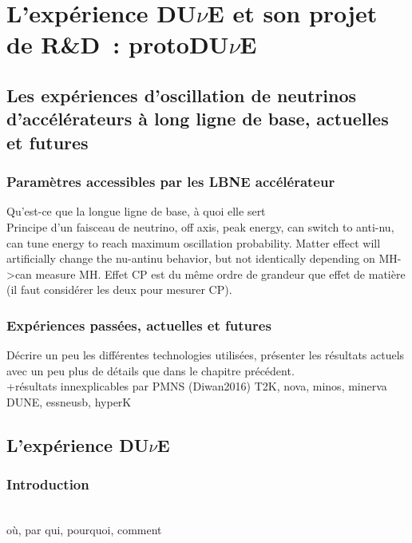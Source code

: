 \chapter{L'expérience DU$\nu$E et son projet de R\&D~: protoDU$\nu$E}
    
    \section{Les expériences d'oscillation de neutrinos d'accélérateurs à long ligne de base, actuelles et futures}
    
        \subsection{Paramètres accessibles par les LBNE accélérateur}
            
            Qu'est-ce que la longue ligne de base, à quoi elle sert\\
            Principe d'un faisceau de neutrino, off axis, peak energy, can switch to anti-nu, can tune energy to reach maximum oscillation probability. Matter effect will artificially change the nu-antinu behavior, but not identically depending on MH->can measure MH. Effet CP est du même ordre de grandeur que effet de matière (il faut considérer les deux pour mesurer CP).
                
        \subsection{Expériences passées, actuelles et futures}
            Décrire un peu les différentes technologies utilisées, présenter les résultats actuels avec un peu plus de détails que dans le chapitre précédent.\\
            +résultats innexplicables par PMNS (Diwan2016)
            T2K, nova, minos, minerva
            \cite{Diwan2016}\\
            DUNE, essneusb, hyperK
            
        
    \section{L'expérience DU$\nu$E}
    
        \subsection{Introduction}
            \cite{lbnf_vol1}\\
            où, par qui, pourquoi, comment

